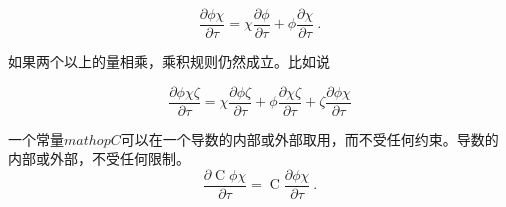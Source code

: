 \documentclass[MathematicsNumericsDerivationsAndOpenFOAM.tex]{subfiles}
\begin{document}
%
%
\begin{equation}
 \frac{\partial \phi \chi}{\partial \tau}
 =
 \chi \frac{\partial \phi }{\partial \tau}
+
 \phi \frac{\partial \chi}{\partial \tau}
 \label{EQUATION::productRuleCartesian} ~.
\end{equation}
%
%

如果两个以上的量相乘，乘积规则仍然成立。比如说

%
%
\begin{equation}
 \frac{\partial \phi \chi \zeta}{\partial \tau}
 =
 \chi \frac{\partial \phi\zeta }{\partial \tau}
+
 \phi \frac{\partial \chi\zeta}{\partial \tau}
+
 \zeta \frac{\partial \phi \chi}{\partial \tau}
\end{equation}
%
%

	一个常量$mathop{C}$可以在一个导数的内部或外部取用，而不受任何约束。导数的内部或外部，不受任何限制。
%
%
\begin{equation}
 \frac{\partial \mathop{C} \phi \chi}{\partial \tau}
=
 \mathop{C} \frac{\partial \phi \chi}{\partial \tau} ~.
\end{equation}
%
%
%
%
%
\end{document}
